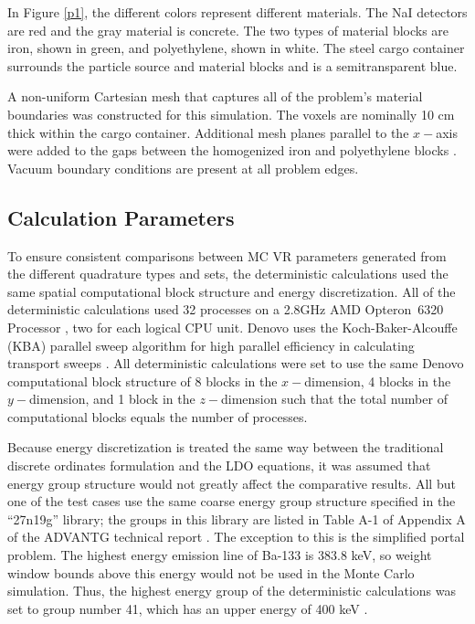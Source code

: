 \documentclass{article} %
\begin{document}
In Figure \ref{p1}, the different colors represent different materials. The NaI
detectors are red and the gray material is concrete. The two types of material
blocks are iron, shown in green, and polyethylene, shown in white. The steel
cargo container surrounds the particle source and material blocks and is a
semitransparent blue.

A non-uniform Cartesian mesh that captures all of the problem's material
boundaries was constructed for this simulation. The voxels are nominally 10 cm
thick within the cargo container. Additional mesh planes parallel to the
$x-$axis were added to the gaps between the homogenized iron and polyethylene
blocks \cite{advantg}. Vacuum boundary conditions are present at all problem
edges.

\subsection{Calculation Parameters}
\label{params}

To ensure consistent comparisons between MC VR parameters generated from the
different quadrature types and sets, the deterministic calculations used the
same spatial computational block structure and energy discretization.
All of the deterministic calculations used 32 processes on a 2.8GHz AMD
Opteron\texttrademark\ 6320 Processor \cite{amd}, two for each logical CPU
unit. Denovo uses the Koch-Baker-Alcouffe (KBA) parallel sweep algorithm for
high parallel efficiency in calculating transport sweeps \cite{denovo}. All
deterministic calculations were set to use the same Denovo computational block
structure of 8 blocks in the $x-$dimension, 4 blocks in the $y-$dimension, and
1 block in the $z-$dimension such that the total number of computational blocks
equals the number of processes.

Because energy discretization is treated the same way between the traditional
discrete ordinates formulation and the LDO equations, it was assumed that
energy group structure would not greatly affect the comparative results. All
but one of the test cases use the same coarse energy group structure specified
in the ``27n19g'' library; the groups in this library are listed in Table A-1
of Appendix A of the ADVANTG technical report \cite{advantg}. The exception to
this is the simplified portal problem. The highest energy emission line of
Ba-133 is 383.8 keV, so weight window bounds above this energy would not be
used in the Monte Carlo simulation. Thus, the highest energy group of the
deterministic calculations was set to group number 41, which has an upper
energy of 400 keV \cite{advantg}.
\end{document}

